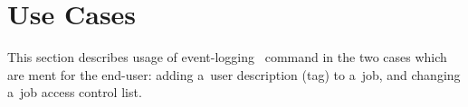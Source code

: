 \section{Use Cases}

This section describes usage of event-logging \LB\ command in the two
cases which are ment for the end-user: adding a~user description (tag)
to a~job, and changing a~job access control list.




